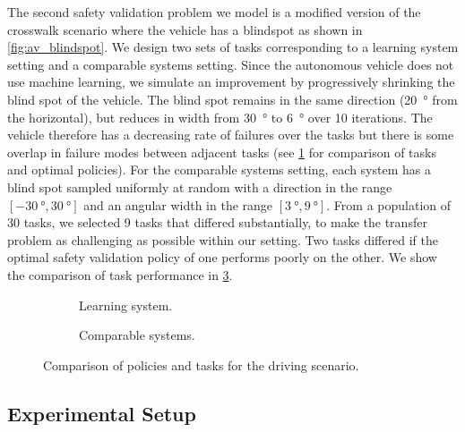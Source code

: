 The second safety validation problem we model is a modified version of the crosswalk scenario where the vehicle has a blindspot as shown in \cref{fig:av_blindspot}. We design two sets of tasks corresponding to a learning system setting and a comparable systems setting. Since the autonomous vehicle does not use machine learning, we simulate an improvement by progressively shrinking the blind spot of the vehicle. The blind spot remains in the same direction (\SI{20}{\degree} from the horizontal), but reduces in width from \SI{30}{\degree} to \SI{6}{\degree} over \num{10} iterations. The vehicle therefore has a decreasing rate of failures over the tasks but there is some overlap in failure modes between adjacent tasks (see \cref{fig:ch7_comps_lad} for comparison of tasks and optimal policies). For the comparable systems setting, each system has a blind spot sampled uniformly at random with a direction in the range $[\SI{-30}{\degree}, \SI{30}{\degree}]$ and an angular width in the range $[\SI{3}{\degree}, \SI{9}{\degree}]$. From a population of \num{30} tasks, we selected \num{9} tasks that differed substantially, to make the transfer problem as challenging as possible within our setting. Two tasks differed if the optimal safety validation policy of one performs poorly on the other. We show the comparison of task performance in \cref{fig:ch7_comps_cad}.

\begin{figure}
    \centering
    \begin{subfigure}[b]{0.49\textwidth}
        \centering
        
        \caption{Learning system.}
        \label{fig:ch7_comps_lad}
    \end{subfigure}
    \hfill
    \begin{subfigure}[b]{0.49\textwidth}
        \centering
        
        \caption{Comparable systems.}
        \label{fig:ch7_comps_cad}
    \end{subfigure}
    \caption{Comparison of policies and tasks for the driving scenario.}
\end{figure}



\subsection{Experimental Setup}

